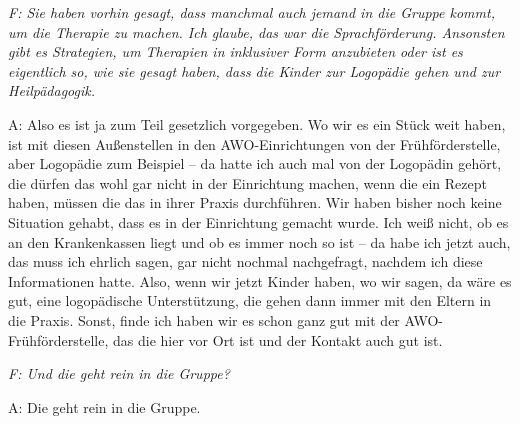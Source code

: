 \begin{linenumbers*}
\emph{F: Sie haben vorhin gesagt, dass manchmal auch jemand in die Gruppe kommt, um die Therapie zu machen. Ich glaube, das war die Sprachförderung. Ansonsten gibt es Strategien, um Therapien in inklusiver Form anzubieten oder ist es eigentlich so, wie sie gesagt haben, dass die Kinder zur Logopädie gehen und zur Heilpädagogik.}

A: Also es ist ja zum Teil gesetzlich vorgegeben. Wo wir es ein Stück weit haben, ist mit diesen Außenstellen in den AWO-Einrichtungen von der Frühförderstelle, aber Logopädie zum Beispiel -- da hatte ich auch mal von der Logopädin gehört, die dürfen das wohl gar nicht in der Einrichtung machen, wenn die ein Rezept haben, müssen die das in ihrer Praxis durchführen. Wir haben bisher noch keine Situation gehabt, dass es in der Einrichtung gemacht wurde. Ich weiß nicht, ob es an den Krankenkassen liegt und ob es immer noch so ist -- da habe ich jetzt auch, das muss ich ehrlich sagen, gar nicht nochmal nachgefragt, nachdem ich diese Informationen hatte. Also, wenn wir jetzt Kinder haben, wo wir sagen, da wäre es gut, eine logopädische Unterstützung, die gehen dann immer mit den Eltern in die Praxis. Sonst, finde ich haben wir es schon ganz gut mit der AWO-Frühförderstelle, das die hier vor Ort ist und der Kontakt auch gut ist.

\emph{F: Und die geht rein in die Gruppe?}

A: Die geht rein in die Gruppe. 
\end{linenumbers*}
       
